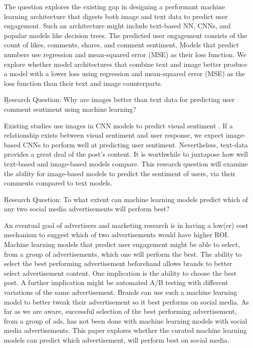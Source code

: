 \documentclass[mksc,blindrev]{informs3} %
\begin{document}

The question explores the existing gap in designing a performant machine learning architecture that digests both image and text data to predict user engagement. Such an architecture might include text-based NN, CNNs, and popular models like decision trees. The predicted user engagement consists of the count of likes, comments, shares, and comment sentiment. Models that predict numbers use regression and mean-squared error (MSE) as their loss function. We explore whether model architectures that combine text and image better produce a model with a lower loss using regression and mean-squared error (MSE) as the loss function than their text and image counterparts. 

\b{Research Question:} Why are images better than text data for predicting user comment sentiment using machine learning?


Existing studies use images in CNN models to predict visual sentiment \cite{Segalin2017, Xu2014}. If a relationship exists between visual sentiment and user response, we expect image-based CNNs to perform well at predicting user sentiment. Nevertheless, text-data provides a great deal of the post's content. It is worthwhile to juxtapose how well text-based and image-based models compare. This research question will examine the ability for image-based models to predict the sentiment of users, via their comments compared to text models.

\b{Research Question:} To what extent can machine learning models predict which of any two social media advertisements will perform best?


An eventual goal of advertisers and marketing research is in having a low(er) cost mechanism to suggest which of two advertisements would have higher ROI. Machine learning models that predict user engagement might be able to select, from a group of advertisements, which one will perform the best. The ability to select the best performing advertisement beforehand allows brands to better select advertisement content. One implication is the ability to choose the best post. A further implication might be automated A/B testing with different variations of the same advertisement. Brands can use such a machine learning model to better tweak their advertisement so it best performs on social media. As far as we are aware, successful selection of the best performing advertisement, from a group of ads, has not been done with machine learning models with social media advertisements. This paper explores whether the curated machine learning models can predict which advertisement, will perform best on social media.
\end{document}

